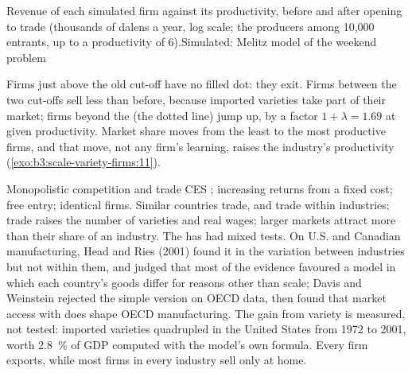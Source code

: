 \begin{omchart}{Revenue of each simulated firm against its productivity, before
and after opening to trade (thousands of dalens a year, log scale; the producers among 10{,}000 entrants,
up to a productivity of 6).}{Simulated: Melitz model of the weekend problem}
\end{omchart}

Firms just above the old cut-off have no filled dot: they exit. Firms between the
two cut-offs sell less than before, because imported varieties take part of
their market; firms beyond the  (the dotted line) jump up, by a
factor $1 + \lambda = 1.69$ at given productivity. Market share moves from the least
to the most productive firms, and that move, not any firm's learning, raises the
industry's productivity (\cref{exo:b3:scale-variety-firms:11}).

\begin{model}{Monopolistic competition and trade}
\assumes CES ; increasing returns from a fixed cost; free entry;
identical firms.
\predicts Similar countries trade, and trade within industries; trade raises the
number of varieties and real wages; larger markets attract more than their share
of an industry.
\tested The  has had mixed tests. On U.S. and Canadian
manufacturing, Head and Ries (2001) found it in the variation between industries but
not within them, and judged that most of the evidence favoured a model in which
each country's goods differ for reasons other than scale; Davis and Weinstein
rejected the simple version on OECD data, then found that market access with
 does shape OECD manufacturing. %
The gain from variety is measured, not tested: imported varieties quadrupled in the
United States from 1972 to 2001, worth 2.8~\% of GDP computed with the model's own
formula. %
\breaks Every firm exports, while most firms in every industry sell only at home.
\end{model}

